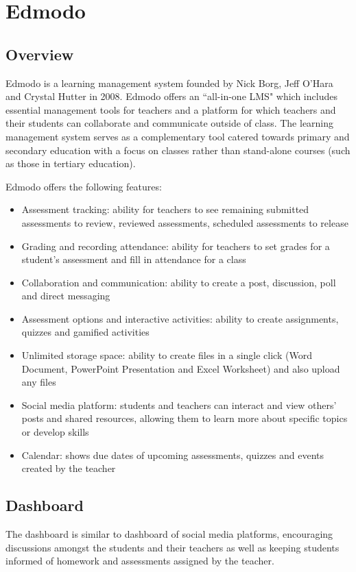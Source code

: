 \section{Edmodo}
\subsection{Overview}
Edmodo is a learning management system founded by Nick Borg, Jeff O'Hara and Crystal Hutter in 2008. Edmodo offers an ``all-in-one LMS" which includes essential management tools for teachers and a platform for which teachers and their students can collaborate and communicate outside of class. The learning management system serves as a complementary tool catered towards primary and secondary education with a focus on classes rather than stand-alone courses (such as those in tertiary education)\cite{edmodoAbout}. 

Edmodo offers the following features\cite{edmodoLMS}:
\begin{itemize}
    \item Assessment tracking: ability for teachers to see remaining submitted assessments to review, reviewed assessments, scheduled assessments to release
    \item Grading and recording attendance: ability for teachers to set grades for a student's assessment and fill in attendance for a class
    \item Collaboration and communication: ability to create a post, discussion, poll and direct messaging
    \item Assessment options and interactive activities: ability to create assignments, quizzes and gamified activities\cite{edmodoGamification}
    \item Unlimited storage space: ability to create files in a single click (Word Document, PowerPoint Presentation and Excel Worksheet) and also upload any files
    \item Social media platform: students and teachers can interact and view others' posts and shared resources, allowing them to learn more about specific topics or develop skills
    \item Calendar: shows due dates of upcoming assessments, quizzes and events created by the teacher
\end{itemize}

\subsection{Dashboard}
The dashboard is similar to dashboard of social media platforms, encouraging discussions amongst the students and their teachers as well as keeping students informed of homework and assessments assigned by the teacher.

